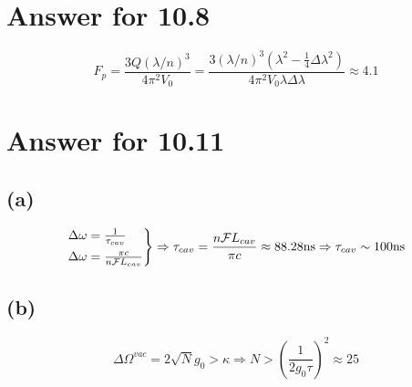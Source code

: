 \documentclass[twoside]{article}
\begin{document}
\section*{Answer for 10.8}

\begin{equation}
    F_p = \frac{3Q \left(\lambda/n\right)^3}{4\pi^2 V_0} = \frac{3\left(\lambda /n\right)^3 \left(\lambda^2 - \frac{1}{4}\Delta \lambda^2\right)}{4 \pi^2 V_0 \lambda \Delta \lambda } \approx 4.1
\end{equation}

\section*{Answer for 10.11}

\subsection*{(a)}


\begin{equation}
    \begin{rcases}
        \Delta \omega = \frac{1}{\tau_{cav}} \\
        \Delta \omega = \frac{\pi c}{n \mathcal{F}L_{cav}}
    \end{rcases}
    \Rightarrow
    \tau_{cav} = \frac{n \mathcal{F} L_{cav}}{\pi c} \approx 88.28 \text{ns}
    \Rightarrow
    \tau_{cav} \sim 100 \text{ns}
\end{equation}


\subsection*{(b)}

\begin{equation}
    \Delta \Omega^{vac} = 2 \sqrt{N} g_0 > \kappa \Rightarrow N > \left(\frac{1}{2g_0 \tau}\right)^2 \approx 25
\end{equation}
\end{document}
